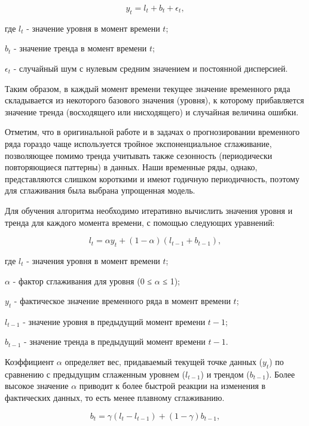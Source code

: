 \begin{equation}
	\label{eq:LT_decompose}
	y_t=l_t + b_t + \epsilon_t,
\end{equation}
	

где $l_t$ - значение уровня в момент времени $t$;

 $b_t$ - значение тренда в момент времени $t$;
 
 $\epsilon_t$ - случайный шум с нулевым средним значением и постоянной дисперсией. 
 
Таким образом, в каждый момент времени текущее значение временного ряда складывается из некоторого базового значения (уровня), к которому прибавляется значение тренда (восходящего или нисходящего) и случайная величина ошибки.

Отметим, что в оригинальной работе и в задачах о прогнозировании временного ряда гораздо чаще используется тройное экспоненциальное сглаживание, позволяющее помимо тренда учитывать также сезонность (периодически повторяющиеся паттерны) в данных. Наши временные ряды, однако, представляются слишком короткими и имеют годичную периодичность, поэтому для сглаживания была выбрана упрощенная модель.

Для обучения алгоритма необходимо итеративно вычислить значения уровня и тренда для каждого момента времени, с помощью следующих уравнений:

\begin{equation}
	l_t = \alpha y_t + (1 - \alpha)(l_{t-1} + b_{t-1}),
\end{equation}

где $l_t$ - значения уровня в момент времени $t$;

	$\alpha$ - фактор сглаживания для уровня (0 ≤ $\alpha$ ≤ 1); 
	
	$y_t$ - фактическое значение временного ряда в момент времени $t$; 
	
	$l_{t-1}$ - значение уровня в предыдущий момент времени $t-1$;
	
	$b_{t-1}$ - значение тренда в предыдущий момент времени $t-1$.


 Коэффициент $\alpha$  определяет вес, придаваемый текущей точке данных ($y_t$) по сравнению с предыдущим сглаженным уровнем ($l_{t−1}$) и трендом ($b_{t-1}$). Более высокое значение $\alpha$ приводит к более быстрой реакции на изменения в фактических данных, то есть менее плавному сглаживанию.

\begin{equation}
	b_t = \gamma (l_t - l_{t-1}) + (1 - \gamma) b_{t-1},
\end{equation}
	
